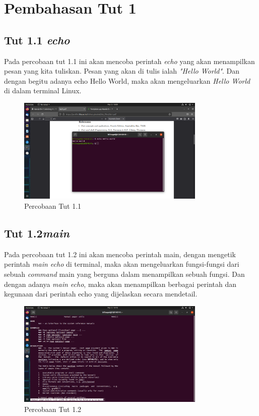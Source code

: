 \documentclass[11pt,a4paper]{article}
\begin{document}
\section{Pembahasan Tut 1}
\subsection{Tut 1.1 \textit{echo}}
	Pada percobaan tut 1.1 ini akan mencoba perintah \textit{echo} yang akan menampilkan pesan yang kita tuliskan. Pesan yang akan 
	di tulis ialah \textit{"Hello World"}. Dan dengan begitu adanya echo Hello World, maka akan mengeluarkan \textit{Hello World} 
	di dalam terminal Linux.
	\begin{figure}[h]
		\centering
		\includegraphics[width=0.8\textwidth]{Figure/tut 1.1.png}
		\caption{Percobaan Tut 1.1}
	\end{figure}

\subsection{Tut 1.2\textit{main}}
    Pada percobaan tut 1.2 ini akan mencoba perintah main, dengan mengetik perintah \textit{main echo} di terminal, maka akan 
	mengeluarkan fungsi-fungsi dari sebuah \textit{command} main yang berguna dalam menampilkan sebuah fungsi. Dan dengan adanya \textit{main echo},
	maka akan menampilkan berbagai perintah dan kegunaan dari perintah echo yang dijelaskan secara mendetail.
	\begin{figure}[h]
		\centering
		\includegraphics[width=0.8\textwidth]{Figure/tut 1.2.png}
		\caption{Percobaan Tut 1.2}
	\end{figure}
\end{document}

